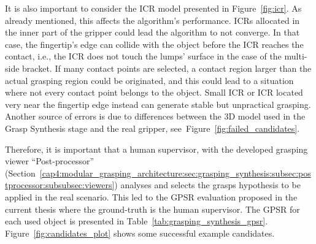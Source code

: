 It is also important to consider the \ac{ICR} model presented in Figure~\ref{fig:icr}. As already mentioned, this affects the algorithm's performance. \ac{ICR}s allocated in the inner part of the gripper could lead the algorithm to not converge. In that case, the fingertip's edge can collide with the object before the \ac{ICR} reaches the contact,  i.e., the \ac{ICR} does not touch the lumps' surface in the case of the multi-side bracket. If many contact points are selected, a contact region larger than the actual grasping region could be originated, and this could lead to a situation where not every contact point belongs to the object. Small \ac{ICR} or \ac{ICR} located very near the fingertip edge instead can generate stable but unpractical grasping. Another source of errors is due to differences between the 3D model used in the Grasp Synthesis stage and the real gripper, see~Figure~\ref{fig:failed_candidates}.

\begin{figure}[h!]
\end{figure}

Therefore, it is important that a human supervisor, with the developed grasping viewer ``Post-processor'' (Section~\ref{cap4:modular_grasping_architecture:sec:grasping_synthesis:subsec:postprocessor:subsubsec:viewers}) analyses and selects the grasps hypothesis to be applied in the real scenario. This led to the \ac{GPSR} evaluation proposed in the current thesis where the ground-truth is the human supervisor. The \ac{GPSR} for each used object is presented in Table~\ref{tab:grasping_synthesis_gpsr}. Figure~\ref{fig:candidates_plot} shows some successful example candidates.

